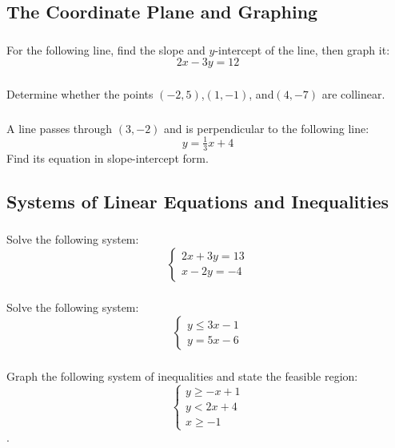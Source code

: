 \documentclass[12pt]{article}
\begin{document}
		\subsection{The Coordinate Plane and Graphing}
			\subsubsection{}
				For the following line, find the slope and \(y\)-intercept of the line, then graph it:
				\[2x-3y=12\]
			\subsubsection{}
				Determine whether the points \(( -2,5)\),\((1,-1)\), and\((4,-7)\) are collinear.
			\subsubsection{}
				A line passes through \((3,-2)\) and is perpendicular to the following line:
				\[y=\tfrac{1}{3}x+4\]
				Find its equation in slope-intercept form.

		\subsection{Systems of Linear Equations and Inequalities}
			\subsubsection{}
				Solve the following system:
				\[\begin{cases}2x+3y=13\\x-2y=-4\end{cases}\]
			\subsubsection{}
				Solve the following system:
				\[\begin{cases}y\le3x-1\\y=5x-6\end{cases}\]
			\subsubsection{}
				Graph the following system of inequalities and state the feasible region:
				\[\begin{cases}y\ge-x+1\\y<2x+4\\x\ge-1\end{cases}\].
\end{document}
